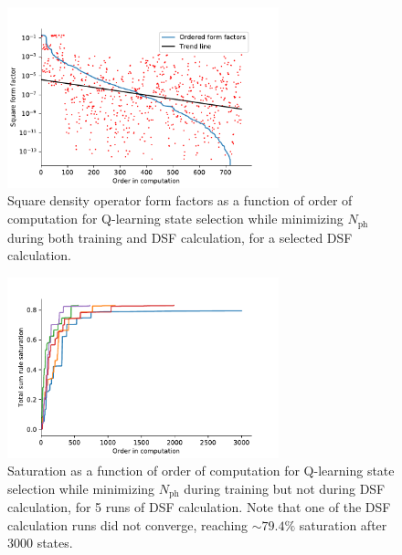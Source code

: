 \documentclass[11pt, a4paper]{report} %
\begin{document}
\begin{figure}[tb!]
  \centering
  \includegraphics[width=0.7\textwidth]{ff_sizes_rand_False_check_train_True_check_eval_True.pdf}
  \caption{Square density operator form factors as a function of order of computation for Q-learning state selection while minimizing \(N_{\mathrm{ph}}\) during both training and DSF calculation, for a selected DSF calculation.}\label{fig:ff_sizes_rand_False_check_train_True_check_eval_True}
\end{figure}

\begin{figure}[tb!]
  \centering
  \includegraphics[width=0.7\textwidth]{saturation_histories_rand_False_check_train_True_check_eval_False}
  \caption{Saturation as a function of order of computation for Q-learning state selection while minimizing \(N_{\mathrm{ph}}\) during training but not during DSF calculation, for 5 runs of DSF calculation. Note that one of the DSF calculation runs did not converge, reaching $\sim79.4\%$ saturation after 3000 states.}\label{fig:saturation_histories_rand_False_check_train_True_check_eval_False}
\end{figure}
\end{document}
